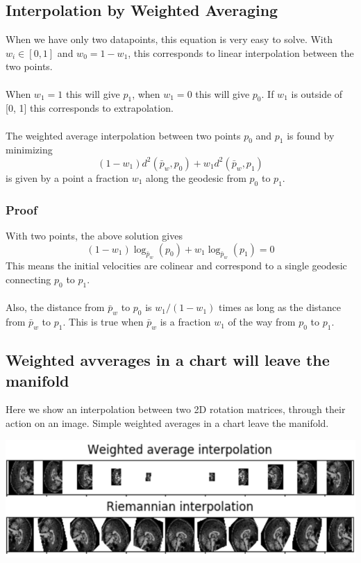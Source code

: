 \documentclass[10pt]{article}
\begin{document}
\subsection*{Interpolation by Weighted Averaging}
When we have only two datapoints, this equation is very easy to solve.  With $w_i \in [0, 1]$ and $w_0 = 1 - w_1$, this corresponds to linear interpolation between the two points.\\\\
When $w_1 = 1$ this will give $p_1$, when $w_1 = 0$ this will give $p_0$.  If $w_1$ is outside of [0, 1] this corresponds to extrapolation.\\\\
The weighted average interpolation between two points $p_0$ and $p_1$ is found by minimizing
\[(1 - w_1)d^2(\bar{p}_w, p_0) + w_1 d^2 (\bar{p}_w, p_1)\]
is given by a point a fraction $w_1$ along the geodesic from $p_0$ to $p_1$.

\subsubsection*{Proof}
With two points, the above solution gives
\[(1 - w_1) \log_{\bar{p}_w}(p_0) + w_1 \log_{\bar{p}_w} (p_1) = 0\]
This means the initial velocities are colinear and correspond to a single geodesic connecting $p_0$ to $p_1$.\\\\
Also, the distance from $\bar{p}_w$ to $p_0$ is $w_1 / (1 - w_1)$ times as long as the distance from $\bar{p}_w$ to $p_1$.  This is true when $\bar{p}_w$ is a fraction $w_1$ of the way from $p_0$ to $p_1$.

\subsection*{Weighted avverages in a chart will leave the manifold}
Here we show an interpolation between two 2D rotation matrices, through their action on an image.  Simple weighted averages in a chart leave the manifold.
\begin{center} 
	\includegraphics*[width=\textwidth]{W9_4.png} 
\end{center}
\end{document}
